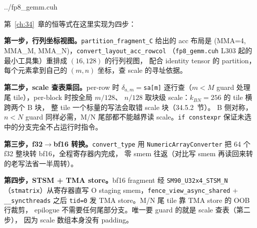 \begin{lstinputlisting}[linerange={545-586},firstnumber=auto,
  title={fp8\_gemm.cuh L545-586（epilogue：scale 查表 $\to$ bf16 转换 $\to$ STSM $\to$ TMA store）}]{../fp8_gemm.cuh}
\end{lstinputlisting}

第~\ref{ch:34}~章的恒等式在这里实现为四步：

\textbf{第一步，行列坐标视图。}\texttt{partition\_fragment\_C} 给出的 acc
布局是 (MMA=4, MMA\_M, MMA\_N)，\texttt{convert\_layout\_acc\_rowcol}
（\texttt{fp8\_gemm.cuh} L303 起的最小工具集）重排成 $(16,128)$ 的行列视图，
配合 identity tensor 的 partition，每个元素拿到自己的 $(m,n)$ 坐标，查
scale 的寻址依据。

\textbf{第二步，scale 查表乘回。}per-row 时 $\delta_{a,m} = $\texttt{sa[m]}
逐行查（$m<M$ guard 处理尾 tile），per-block 时按全局 $m/128$、
$n/128$ 取块级 scale：$k_{BN}{=}256$ 的 tile 横跨两个 B 块，
整 tile 一个标量的写法会取错 scale 块（34.5.2~节）。
B 侧对称，$n<N$ guard 同样必需，M/N 尾部都不能越界读 scale。\texttt{if constexpr} 保证未选中的分支完全不占运行时指令。

\textbf{第三步，f32$\to$bf16 转换。}\texttt{convert\_type} 用
\texttt{NumericArrayConverter} 把 64 个 f32 整块转 bf16，全程寄存器内完成，
零 smem 往返（对比写 smem 再读回来转的老写法省一半周转）。

\textbf{第四步，STSM + TMA store。}bf16 fragment 经
\texttt{SM90\_U32x4\_STSM\_N}（\texttt{stmatrix}）从寄存器直写 O staging
smem，\texttt{fence\_view\_async\_shared} + \texttt{\_\_syncthreads} 之后
\texttt{tid=0} 发 TMA store。M/N 尾 tile 靠 TMA store 的 OOB 行裁剪，
epilogue 不需要任何尾部分支。唯一要 guard 的就是 scale 查表（第二步），
因为 scale 数组本身没有 padding。

